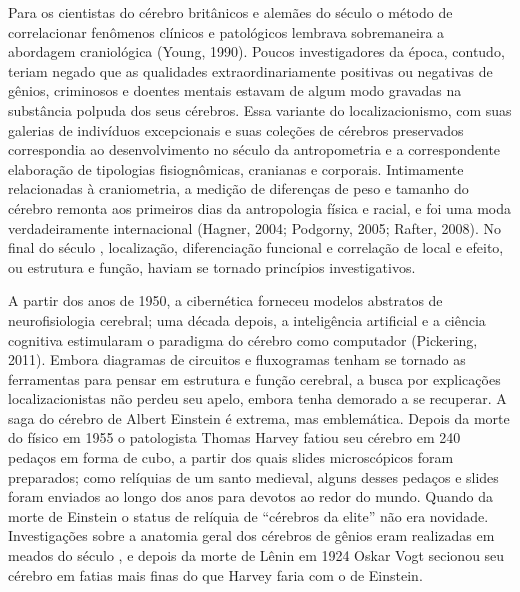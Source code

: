 Para os cientistas do cérebro britânicos e alemães do século  o
método de correlacionar fenômenos clínicos e patológicos lembrava
sobremaneira a abordagem craniológica (Young, 1990). Poucos
investigadores da época, contudo, teriam negado que as qualidades
extraordinariamente positivas ou negativas de gênios, criminosos e
doentes mentais estavam de algum modo gravadas na substância polpuda dos
seus cérebros. Essa variante do localizacionismo, com suas galerias de
indivíduos excepcionais e suas coleções de cérebros preservados
correspondia ao desenvolvimento no século  da antropometria e a
correspondente elaboração de tipologias fisiognômicas, cranianas e
corporais. Intimamente relacionadas à craniometria, a medição de
diferenças de peso e tamanho do cérebro remonta aos primeiros dias da
antropologia física e racial, e foi uma moda verdadeiramente
internacional (Hagner, 2004; Podgorny, 2005; Rafter, 2008). No final do
século , localização, diferenciação funcional e correlação de local e
efeito, ou estrutura e função, haviam se tornado princípios
investigativos.

A partir dos anos de 1950, a cibernética forneceu modelos abstratos de
neurofisiologia cerebral; uma década depois, a inteligência artificial e
a ciência cognitiva estimularam o paradigma do cérebro como computador
(Pickering, 2011). Embora diagramas de circuitos e fluxogramas tenham se
tornado as ferramentas para pensar em estrutura e função cerebral, a
busca por explicações localizacionistas não perdeu seu apelo, embora
tenha demorado a se recuperar. A saga do cérebro de Albert Einstein é
extrema, mas emblemática. Depois da morte do físico em 1955 o
patologista Thomas Harvey fatiou seu cérebro em 240 pedaços em forma de
cubo, a partir dos quais slides microscópicos foram preparados; como
relíquias de um santo medieval, alguns desses pedaços e slides foram
enviados ao longo dos anos para devotos ao redor do mundo. Quando da
morte de Einstein o status de relíquia de ``cérebros da elite'' não era
novidade. Investigações sobre a anatomia geral dos cérebros de gênios
eram realizadas em meados do século , e depois da morte de Lênin em
1924 Oskar Vogt secionou seu cérebro em fatias mais finas do que Harvey
faria com o de Einstein.

